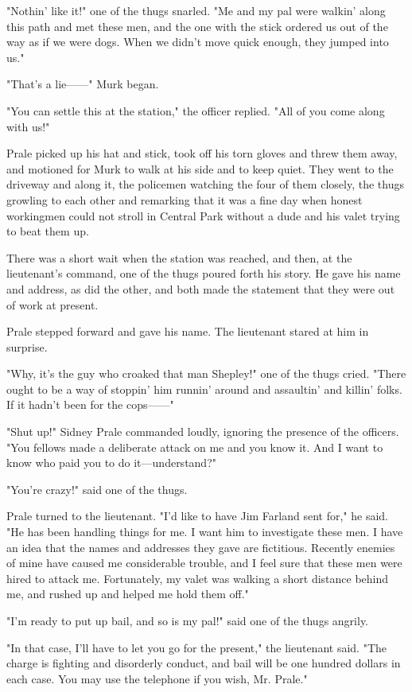 \documentclass{novel}
\begin{document}
"Nothin' like it!" one of the thugs snarled. "Me and my pal were walkin' along this path and met these men, and the one with the stick ordered us out of the way as if we were dogs. When we didn't move quick enough, they jumped into us."

"That's a lie------" Murk began.

"You can settle this at the station," the officer replied. "All of you come along with us!"

Prale picked up his hat and stick, took off his torn gloves and threw them away, and motioned for Murk to walk at his side and to keep quiet. They went to the driveway and along it, the policemen watching the four of them closely, the thugs growling to each other and remarking that it was a fine day when honest workingmen could not stroll in Central Park without a dude and his valet trying to beat them up.

There was a short wait when the station was reached, and then, at the lieutenant's command, one of the thugs poured forth his story. He gave his name and address, as did the other, and both made the statement that they were out of work at present.

Prale stepped forward and gave his name. The lieutenant stared at him in surprise.

"Why, it's the guy who croaked that man Shepley!" one of the thugs cried. "There ought to be a way of stoppin' him runnin' around and assaultin' and killin' folks. If it hadn't been for the cops------"

"Shut up!" Sidney Prale commanded loudly, ignoring the presence of the officers. "You fellows made a deliberate attack on me and you know it. And I want to know who paid you to do it---understand?"

"You're crazy!" said one of the thugs.

Prale turned to the lieutenant. "I'd like to have Jim Farland sent for," he said. "He has been handling things for me. I want him to investigate these men. I have an idea that the names and addresses they gave are fictitious. Recently enemies of mine have caused me considerable trouble, and I feel sure that these men were hired to attack me. Fortunately, my valet was walking a short distance behind me, and rushed up and helped me hold them off."

"I'm ready to put up bail, and so is my pal!" said one of the thugs angrily.

"In that case, I'll have to let you go for the present," the lieutenant said. "The charge is fighting and disorderly conduct, and bail will be one hundred dollars in each case. You may use the telephone if you wish, Mr. Prale."
\end{document}
